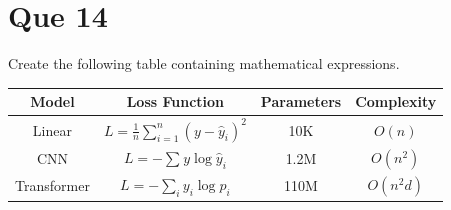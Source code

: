 \documentclass{article}
\begin{document}
	\section*{Que 14}
	Create the following table containing mathematical expressions.
	
	\begin{center}
		\begin{tabular}{|c|c|c|c|}
			\hline
			\textbf{Model}& 
			\textbf{Loss Function}& 
			\textbf{Parameters} & 
			\textbf{Complexity} \\
			\hline
			
			Linear & $L = \frac{1}{n} \sum_{i = 1}^{n}(y - {\hat{y}_i})^2$ & 10K & $O(n)$ \\ 
			\hline
			CNN & $L =- \sum_ {}^{} y\log{\hat{y}_i}$ & 1.2M & $O(n^2)$ \\
			\hline 
			Transformer & $L =- \sum_{i}^{} {y}_i \log {p_i}$ & 110M & $O(n^2d)$ \\ 
			\hline
		\end{tabular}
	\end{center}
\end{document}
